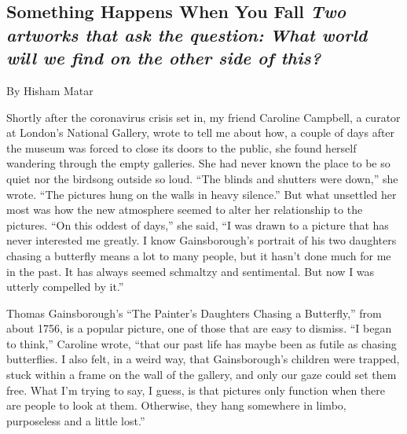 \hypertarget{something-happens-when-you-fall-two-artworks-that-ask-the-question-what-world-will-we-find-on-the-other-side-of-this}{%
\subsection{\texorpdfstring{Something Happens When You Fall \emph{Two
artworks that ask the question:} \emph{What world will we find on the
other side of
this?}}{Something Happens When You Fall Two artworks that ask the question: What world will we find on the other side of this?}}\label{something-happens-when-you-fall-two-artworks-that-ask-the-question-what-world-will-we-find-on-the-other-side-of-this}}

By Hisham Matar

Shortly after the coronavirus crisis set in, my friend Caroline
Campbell, a curator at London's National Gallery, wrote to tell me about
how, a couple of days after the museum was forced to close its doors to
the public, she found herself wandering through the empty galleries. She
had never known the place to be so quiet nor the birdsong outside so
loud. ``The blinds and shutters were down,'' she wrote. ``The pictures
hung on the walls in heavy silence.'' But what unsettled her most was
how the new atmosphere seemed to alter her relationship to the pictures.
``On this oddest of days,'' she said, ``I was drawn to a picture that
has never interested me greatly. I know Gainsborough's portrait of his
two daughters chasing a butterfly means a lot to many people, but it
hasn't done much for me in the past. It has always seemed schmaltzy and
sentimental. But now I was utterly compelled by it.''

Thomas Gainsborough's ``The Painter's Daughters Chasing a Butterfly,''
from about 1756, is a popular picture, one of those that are easy to
dismiss. ``I began to think,'' Caroline wrote, ``that our past life has
maybe been as futile as chasing butterflies. I also felt, in a weird
way, that Gainsborough's children were trapped, stuck within a frame on
the wall of the gallery, and only our gaze could set them free. What I'm
trying to say, I guess, is that pictures only function when there are
people to look at them. Otherwise, they hang somewhere in limbo,
purposeless and a little lost.''

